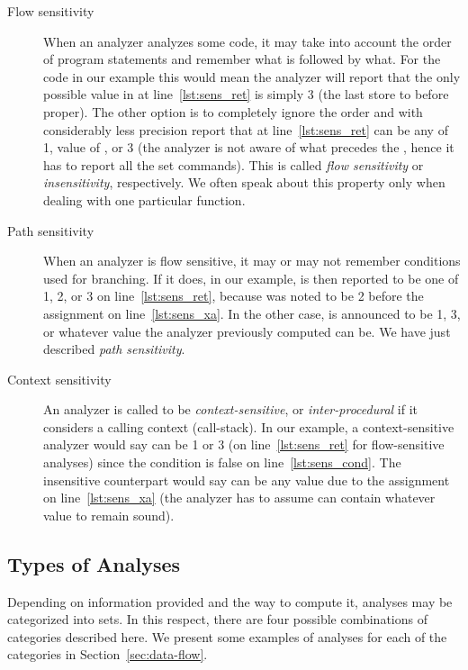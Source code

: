 \begin{description}
\item[Flow sensitivity] When an analyzer analyzes some code, it may take into
account the order of program statements and remember what is followed by what.
For the code in our example this would mean the analyzer will report that the
only possible value in  at line~\ref{lst:sens_ret} is simply 3 (the
last store to  before  proper). The other option is to
completely ignore the order and with considerably less precision report that
 at line~\ref{lst:sens_ret} can be any of 1, value of , or 3
(the analyzer is not aware of what precedes the , hence it has to
report all the set commands).  This is called \emph{flow sensitivity} or
\emph{insensitivity}, respectively. We often speak about this property only
when dealing with one particular function.

\item[Path sensitivity] When an analyzer is flow sensitive, it may or may not
remember conditions used for branching. If it does, in our example, 
is then reported to be one of 1, 2, or 3 on line~\ref{lst:sens_ret}, because
 was noted to be 2 before the assignment on line~\ref{lst:sens_xa}. In
the other case,  is announced to be 1, 3, or whatever value the
analyzer previously computed  can be. We have just described
\emph{path sensitivity}.

\item[Context sensitivity] An analyzer is called to be
\emph{context-sensitive}, or \emph{inter-procedural} if it considers a calling
context (call-stack).  In our example, a context-sensitive analyzer would say
 can be 1 or 3 (on line~\ref{lst:sens_ret} for flow-sensitive
analyses) since the condition  is false on
line~\ref{lst:sens_cond}. The insensitive counterpart would say  can
be any value due to the assignment on line~\ref{lst:sens_xa} (the analyzer has
to assume  can contain whatever value to remain sound).

\end{description}

\subsection{Types of Analyses}\label{sec:types_anal}
Depending on information provided and the way to compute it, analyses may be
categorized into sets. In this respect, there are four possible combinations
of categories described here. We present some examples of analyses for each of
the categories in Section~\ref{sec:data-flow}.

